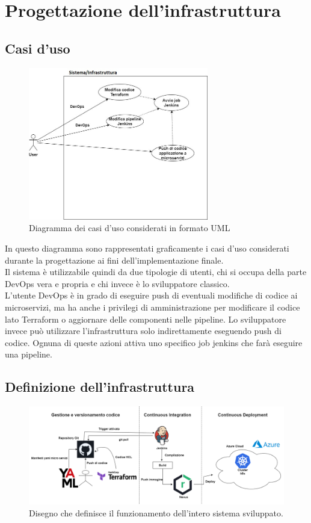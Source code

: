 \documentclass[a4paper,12pt]{report}
\begin{document}
\chapter{Progettazione dell'infrastruttura}
\section{Casi d'uso}

\begin{figure}[h]
	\includegraphics[width=0.7\textwidth]{casi_uso}
    \caption{Diagramma dei casi d'uso considerati in formato UML}
    \label{fig:casi_uso}
\end{figure}
In questo diagramma sono rappresentati graficamente i casi d'uso considerati durante la progettazione ai fini dell'implementazione finale.\\
Il sistema è utilizzabile quindi da due tipologie di utenti, chi si occupa della parte DevOps vera e propria e chi invece è lo sviluppatore classico.\\
L'utente DevOps è in grado di eseguire push di eventuali modifiche di codice ai microservizi, ma ha anche i privilegi di amministrazione per modificare il codice lato Terraform o aggiornare delle componenti nelle pipeline. Lo sviluppatore invece può utilizzare l'infrastruttura solo indirettamente eseguendo push di codice. Ognuna di queste azioni attiva uno specifico job jenkins che farà eseguire una pipeline.\\
\section{Definizione dell'infrastruttura}

\begin{figure}[h]
	\includegraphics[width=1.0\textwidth]{disegno_struttura_infra}
    \caption{Disegno che definisce il funzionamento dell'intero sistema sviluppato.}
    \label{fig:disegno_struttura_infra}
\end{figure}
\end{document}
